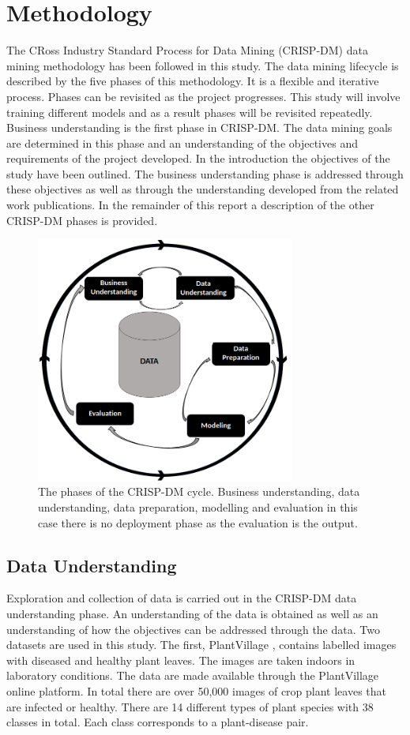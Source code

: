 \documentclass[conference]{IEEEtran}
\begin{document}
\section{Methodology }

The CRoss Industry Standard Process for Data Mining (CRISP-DM) data mining methodology has been followed in this study. The data mining lifecycle is described by the five phases of this methodology. It is a flexible and iterative process. Phases can be revisited as the project progresses. This study will involve training different models and as a result phases will be revisited repeatedly. Business understanding is the first phase in CRISP-DM. The data mining goals are determined in this phase and an understanding of the objectives and requirements of the project developed. In the introduction the objectives of the study have been outlined. The business understanding phase is addressed through these objectives as well as through the understanding developed from the related work publications. In the remainder of this report a description of the other CRISP-DM phases is provided.
\begin{figure}[htbp]
\centerline{\includegraphics[width=8.5cm]{CRISP_DM_no deployment.png}}
\caption{The phases of the CRISP-DM cycle. Business understanding, data understanding, data preparation, modelling and evaluation in this case there is no deployment phase as the evaluation is the output.}
\label{fig}
\end{figure}



\subsection{Data Understanding}\label{AA}
Exploration and collection of data is carried out in the CRISP-DM data understanding phase. An understanding of the data is obtained as well as an understanding of how the objectives can be addressed through the data. Two datasets are used in this study. The first, PlantVillage \cite{kaggledatasetPlantville}, contains labelled images with diseased and healthy plant leaves. The images are taken indoors in laboratory conditions. The data are made available through the PlantVillage online platform. In total there are over 50,000 images of crop plant leaves that are infected or healthy. There are 14 different types of plant species with 38 classes in total. Each class corresponds to a plant-disease pair. 
\end{document}
